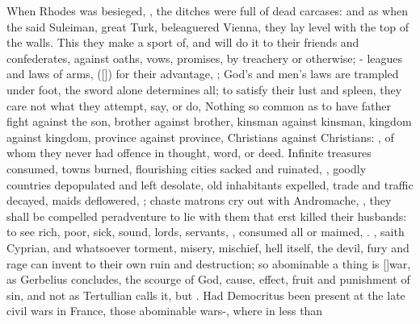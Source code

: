 {When Rhodes was besieged, ,
the ditches were full of dead carcases: and as when the said Suleiman,
great Turk, beleaguered Vienna, they lay level with the top of the
walls. This they make a sport of, and will do it to their friends and
confederates, against oaths, vows, promises, by treachery or otherwise;
- leagues and laws of
arms, ([\baselineskip]) for their advantage, ; God's and men's laws are
trampled under foot, the sword alone determines all; to satisfy their
lust and spleen, they care not what they attempt, say, or do,  Nothing so common as to
have  father fight against the son, brother against brother,
kinsman against kinsman, kingdom against kingdom, province against
province, Christians against Christians: , of whom they never had offence in thought,
word, or deed. Infinite treasures consumed, towns burned, flourishing
cities sacked and ruinated, , goodly
countries depopulated and left desolate, old inhabitants expelled,
trade and traffic decayed, maids deflowered, ; chaste matrons cry out with
Andromache, , they shall be compelled peradventure to lie with them that
erst killed their husbands: to see rich, poor, sick, sound, lords,
servants, , consumed all or maimed, \etc{}. , saith Cyprian,
and whatsoever torment, misery, mischief, hell itself, the devil, 
fury and rage can invent to their own ruin and destruction; so
abominable a thing is [\baselineskip]war, as Gerbelius concludes,  the
scourge of God, cause, effect, fruit and punishment of sin, and not
 as Tertullian calls it, but . Had
Democritus been present at the late civil wars in France, those
abominable wars-, where in less than
}
